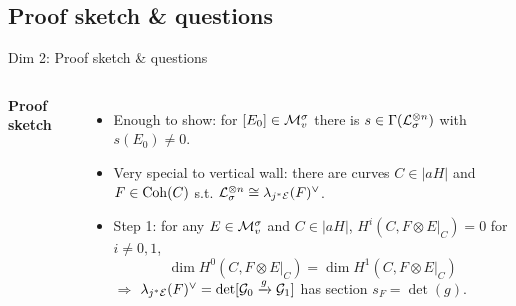 \documentclass[8pt,handout]{beamer} %
\begin{document}
\subsection{Proof sketch \& questions}
\begin{frame}[fragile]{Dim 2: Proof sketch \& questions}
    \begin{columns}[t]
        \textbf{Proof sketch}
        \begin{itemize}
            \item<2-> %
            Enough to show: for $[E_0] \in \mathcal{M}^\sigma_v$ there is $s \in \Gamma(\mathcal{L}_\sigma^{\otimes n})$ with $s(E_0) \neq 0$.
            \item<3-> Very special to vertical wall: there are curves $C \in |a H|$ and $F \in \mathrm{Coh}(C)$ s.t. $\mathcal{L}_\sigma^{\otimes n} \cong \lambda_{j^* \mathcal{E}}(F)^\vee$.
            
            \item<4-> Step 1: for any $E \in \mathcal{M}^\sigma_v$ and $C \in |a H|$,
            $H^i(C, F \otimes E|_C) = 0$ for $i \neq 0, 1$,
            \[ \dim H^0(C, F \otimes E|_C) = \dim H^1(C, F \otimes E|_C) \]
            $\Rightarrow$ $\lambda_{j^*\mathcal{E}}(F)^\vee = \det[\mathcal{G}_0 \xrightarrow{g} \mathcal{G}_1]$ has section $s_F = \det(g)$.
        \end{itemize}
        

\end{columns}
\end{frame}
\end{document}

